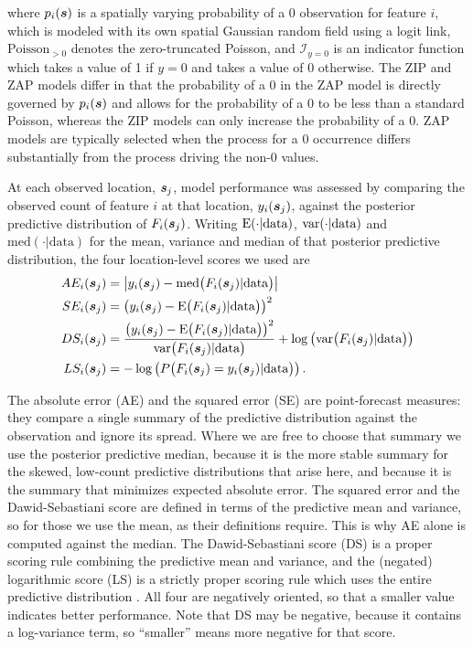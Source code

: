 \documentclass[10pt,letterpaper]{article}
\begin{document}
where $p_i(\mbox{\boldmath $s$})$ is a spatially varying probability of a 0 observation for feature $i$, which is modeled with its own spatial Gaussian random field using a logit link, $\mbox{Poisson}_{>0}$ denotes the zero-truncated Poisson, and $\mathcal{I}_{y=0}$ is an indicator function which takes a value of 1 if $y=0$ and takes a value of 0 otherwise. The ZIP and ZAP models differ in that the probability of a 0 in the ZAP model is directly governed by $p_i(\mbox{\boldmath $s$})$ and allows for the probability of a 0 to be less than a standard Poisson, whereas the ZIP models can only increase the probability of a 0. ZAP models are typically selected when the process for a 0 occurrence differs substantially from the process driving the non-0 values.

At each observed location, $\mbox{\boldmath $s$}_j$, model performance was assessed by comparing the observed count of feature $i$ at that location, $y_i(\mbox{\boldmath $s$}_j)$, against the posterior predictive distribution of $F_i(\mbox{\boldmath $s$}_j)$. Writing $\mbox{E}(\cdot|\mbox{data})$, $\mbox{var}(\cdot|\mbox{data})$ and $\mbox{med}(\cdot|\mbox{data})$ for the mean, variance and median of that posterior predictive distribution, the four location-level scores we used are
\begin{align*}
    AE_i(\mbox{\boldmath $s$}_j)&=\left|y_i(\mbox{\boldmath $s$}_j) - \mbox{med}\big(F_i(\mbox{\boldmath $s$}_j)|\mbox{data}\big)\right|\\
    SE_i(\mbox{\boldmath $s$}_j)&=\left(y_i(\mbox{\boldmath $s$}_j)-  \mbox{E}\big(F_i(\mbox{\boldmath $s$}_j)|\mbox{data}\big)\right)^2\\
    DS_i(\mbox{\boldmath $s$}_j)  &= \frac{\left(y_i(\mbox{\boldmath $s$}_j) - \mbox{E}\big(F_i(\mbox{\boldmath $s$}_j)|\mbox{data}\big)\right)^2}{\mbox{var}\big(F_i(\mbox{\boldmath $s$}_j)|\mbox{data}\big)} + \log\left(\mbox{var}\big(F_i(\mbox{\boldmath $s$}_j)|\mbox{data}\big)\right)\\
    LS_i(\mbox{\boldmath $s$}_j)&=-\log\left(P\big(F_i(\mbox{\boldmath $s$}_j)=y_i(\mbox{\boldmath $s$}_j)|\mbox{data}\big)\right).
\end{align*}

The absolute error (AE) and the squared error (SE) are point-forecast measures: they compare a single summary of the predictive distribution against the observation and ignore its spread. Where we are free to choose that summary we use the posterior predictive median, because it is the more stable summary for the skewed, low-count predictive distributions that arise here, and because it is the summary that minimizes expected absolute error. The squared error and the Dawid-Sebastiani score are defined in terms of the predictive mean and variance, so for those we use the mean, as their definitions require. This is why AE alone is computed against the median. The Dawid-Sebastiani score (DS) is a proper scoring rule combining the predictive mean and variance, and the (negated) logarithmic score (LS) is a strictly proper scoring rule which uses the entire predictive distribution \cite{gneiting2007strictly}. All four are negatively oriented, so that a smaller value indicates better performance. Note that DS may be negative, because it contains a log-variance term, so ``smaller'' means more negative for that score.
\end{document}
